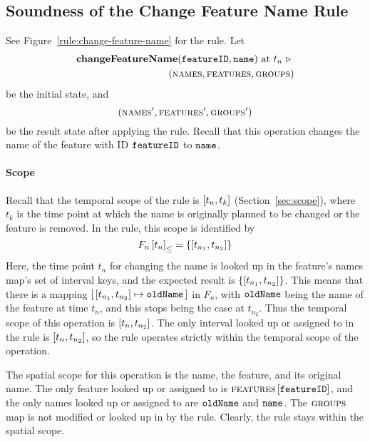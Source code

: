 \subsection{Soundness of the Change Feature Name Rule} 
\label{sub:soundness-of-the-change-feature-name-rule}

See Figure~\vref{rule:change-feature-name} for the  rule. Let 
\begin{equation*}
   \begin{split}
      \textbf{changeFeatureName}(\texttt{featureID}, \texttt{name}) \text{ at } t_n \ \triangleright \  \\
      (\textsc{names}, \textsc{features}, \textsc{groups}{})
   \end{split}
\end{equation*}
be the initial state, and
\[
   (\textsc{names}', \textsc{features}', \textsc{groups}{}')
\]
be the result state after applying the  rule. Recall that this operation changes the name of the feature with ID $\texttt{featureID}$ to $\texttt{name}$.

\paragraph{Scope}
Recall that the temporal scope of the  rule is $\interval{t_n}{t_k}$ (Section~\vref{sec:scope}), where $t_k$ is the time point at which the name is originally planned to be changed or the feature is removed. In the rule, this scope is identified by 
   \[
      \containing{F_n}{t_n} = \set{\interval{t_{n_1}}{t_{n_2}}}
   \]
   Here, the time point $t_n$ for changing the name is looked up in the feature's names map's set of interval keys, and the expected result is $\set{\interval{t_{n_1}}{t_{n_2}}}$. This means that there is a mapping $\intervalmapping{t_{n_1}}{t_{n_2}}{\var{oldName}}$ in $F_n$, with $\texttt{oldName}$ being the name of the feature at time $t_n$, and this stops being the case at $t_{n_2}$. Thus the temporal scope of this operation is $\interval{t_n}{t_{n_2}}$. The only interval looked up or assigned to in the rule is $\interval{t_n}{t_{n_2}}$, so the rule operates strictly within the temporal scope of the operation.

   The spatial scope for this operation is the name, the feature, and its original name. The only feature looked up or assigned to is $\textsc{features} \left[ \texttt{featureID} \right]$, and the only names looked up or assigned to are $\texttt{oldName}$ and $\texttt{name}$. The $\textsc{groups}{}{}$ map is not modified or looked up in by the rule. Clearly, the rule stays within the spatial scope.
\\

